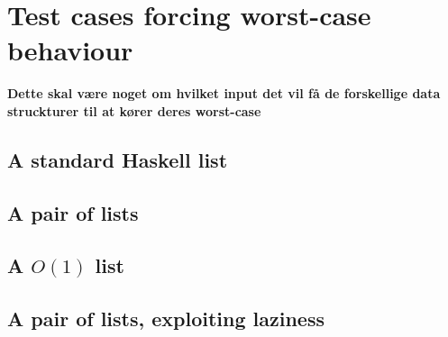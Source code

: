 \section*{Test cases forcing worst-case behaviour}
\textbf{Dette skal være noget om hvilket input det vil få de forskellige data struckturer til at kører deres worst-case}

\subsection*{A standard Haskell list}
\subsection*{A pair of lists}
\subsection*{A $O(1)$ list}
\subsection*{A pair of lists, exploiting laziness}